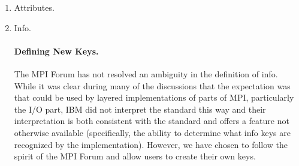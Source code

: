 \documentclass{article}
\begin{document}
\begin{enumerate}

  \begin{enumerate}
  \item Attributes. 
  \item Info.
\paragraph{Defining New Keys.}
The MPI Forum has not resolved an ambiguity in the definition of
info.  While it was clear during many of the discussions that the
expectation was that  could be used by
layered implementations of parts of MPI, particularly the I/O part,
IBM did not interpret the standard this way and their interpretation
is both consistent with the standard and offers a feature not
otherwise available (specifically, the ability to determine what info
keys are recognized by the implementation).  However, we have chosen to follow
the spirit of the MPI Forum and allow users to create their own keys.



\end{enumerate}
\end{enumerate}
\end{document}
